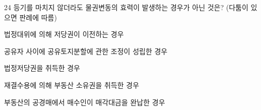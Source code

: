 \begin{question}{24}
등기를 마치지 않더라도 물권변동의 효력이 발생하는 경우가 아닌 것은? (다툼이 있으면 판례에 따름)
\begin{choices}
  \item 법정대위에 의해 저당권이 이전하는 경우
  \item 공유자 사이에 공유토지분할에 관한 조정이 성립한 경우
  \item 법정저당권을 취득한 경우
  \item 재결수용에 의해 부동산 소유권을 취득한 경우
  \item 부동산의 공경매에서 매수인이 매각대금을 완납한 경우
\end{choices}
\end{question}
